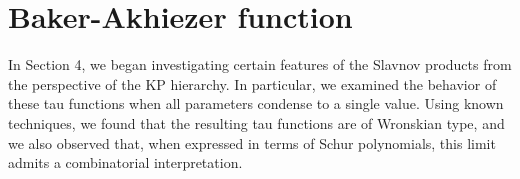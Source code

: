\documentclass[a4paper,11pt]{amsart}
\begin{document}

\section{Baker-Akhiezer function}

In Section 4, we began investigating certain features of the Slavnov
products from the perspective of the KP hierarchy. In particular, we
examined the behavior of these tau functions when all parameters
condense to a single value. Using known techniques, we found that the
resulting tau functions are of Wronskian type, and we also observed
that, when expressed in terms of Schur polynomials, this limit admits
a combinatorial interpretation.
\end{document}
